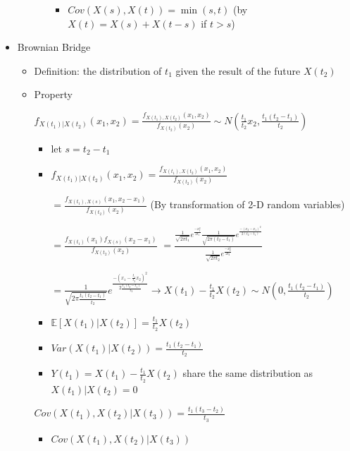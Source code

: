 \documentclass[a4paper]{article}
\begin{document}
\begin{itemize}
\begin{itemize}
\begin{itemize}
\begin{itemize}
                            \item $\mathit{Cov}(X(s), X(t)) = \min(s, t)$ (by $X(t) = X(s) + X(t-s)$ if $t > s$)
                        \end{itemize}
                \end{itemize}
        \end{itemize}
    \item Brownian Bridge
        \begin{itemize}
            \item Definition: the distribution of $t_1$ given the result of the future $X(t_2)$
            \item Property


                $f_{X(t_1)|X(t_2)}(x_1, x_2) = \frac{f_{X(t_1), X(t_2)}(x_1, x_2)}{f_{X(t_2)}(x_2)} \sim N(\frac{t_1}{t_2}x_2, \frac{t_1(t_2 - t_1)}{t_2})$
                \begin{itemize}
                    \item let $s = t_2 - t_1$
                    \item $f_{X(t_1)|X(t_2)}(x_1, x_2) = \frac{f_{X(t_1), X(t_2)}(x_1, x_2)}{f_{X(t_2)}(x_2)}$

                        $= \frac{f_{X(t_1), X(s)}(x_1, x_2 - x_1)}{f_{X(t_2)}(x_2)}$ (By transformation of 2-D random variables)

                        $= \frac{f_{X(t_1)}(x_1) f_{X(s)}(x_2 - x_1)}{f_{X(t_2)}(x_2)}$
                        $= \frac{\frac{1}{\sqrt{2\pi t_1}}e^{\frac{-x_1^2}{2t_1}} \frac{1}{\sqrt{2\pi(t_2 - t_1)}}e^{\frac{-(x_2-x_1)^2}{2(t_2 - t_1)}}}{\frac{1}{\sqrt{2\pi t_2}}e^{\frac{-x_2^2}{2t_2}}}$

                        $= \frac{1}{\sqrt{2\pi \frac{t_1(t_2 - t_1)}{t_2}}}e^{\frac{-(x_1 - \frac{t_1}{t_2}x_2)^2}{2\frac{t_1(t_2 - t_1)}{t_2}}} \rightarrow X(t_1) - \frac{t_1}{t_2}X(t_2) \sim N(0, \frac{t_1(t_2 - t_1)}{t_2})$
                    \item $\mathbb{E}[X(t_1)|X(t_2)] = \frac{t_1}{t_2}X(t_2)$
                    \item $\mathit{Var}(X(t_1)|X(t_2)) = \frac{t_1(t_2 - t_1)}{t_2}$
                    \item $Y(t_1) = X(t_1) - \frac{t_1}{t_2} X(t_2)$ share the same distribution as $X(t_1) |X(t_2) = 0$
                \end{itemize}
                $\mathit{Cov}(X(t_1), X(t_2)|X(t_3)) = \frac{t_1(t_3-t_2)}{t_3}$
                \begin{itemize}
                    \item  {\small
                        $\mathit{Cov}(X(t_1), X(t_2)|X(t_3))$

}
\end{itemize}
\end{itemize}
\end{itemize}
\end{document}
